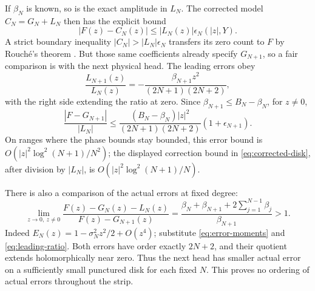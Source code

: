 If \(\beta_N\) is known, so is the exact amplitude in \(L_N\).
The corrected model \(C_N=G_N+L_N\) then has the explicit bound
\begin{equation}
 |F(z)-C_N(z)|\le|L_N(z)|\epsilon_N(|z|,Y).
 \label{eq:corrected-disk}
\end{equation}
A strict boundary inequality
\(|C_N|>|L_N|\epsilon_N\) transfers its zero count to \(F\)
by Rouch\'e's theorem \cite[Theorem~9.21]{topping}. But those same
coefficients already specify \(G_{N+1}\), so a fair comparison is
with the next physical head. The leading errors obey
\begin{equation}
 \frac{L_{N+1}(z)}{L_N(z)}
   =-\frac{\beta_{N+1}z^2}{(2N+1)(2N+2)},
 \label{eq:leading-ratio}
\end{equation}
with the right side extending the ratio at zero. Since
\(\beta_{N+1}\le B_N-\beta_N\), for \(z\ne0\),
\begin{equation}
 \frac{|F-G_{N+1}|}{|L_N|}
 \le\frac{(B_N-\beta_N)|z|^2}{(2N+1)(2N+2)}
                 (1+\epsilon_{N+1}).
 \label{eq:next-head-budget}
\end{equation}
On ranges where the phase bounds stay bounded, this error bound is
\(O(|z|^2\log^2(N+1)/N^2)\); the displayed correction bound
in \eqref{eq:corrected-disk}, after division by \(|L_N|\), is
\(O(|z|^2\log^2(N+1)/N)\).

There is also a comparison of the actual errors at fixed degree:
\begin{equation}
 \lim_{z\to0,\ z\ne0}
 \frac{F(z)-G_N(z)-L_N(z)}{F(z)-G_{N+1}(z)}
 =\frac{\beta_N+\beta_{N+1}+2\sum_{j=1}^{N-1}\beta_j}
        {\beta_{N+1}}>1.
 \label{eq:local-cost-comparison}
\end{equation}
Indeed \(E_N(z)=1-\sigma_N^2z^2/2+O(z^4)\); substitute
\eqref{eq:error-moments} and \eqref{eq:leading-ratio}.
Both errors have order exactly \(2N+2\), and their quotient
extends holomorphically near zero. Thus the next head has smaller
actual error on a sufficiently small punctured disk for each fixed
\(N\). This proves no ordering of actual errors throughout the strip.
